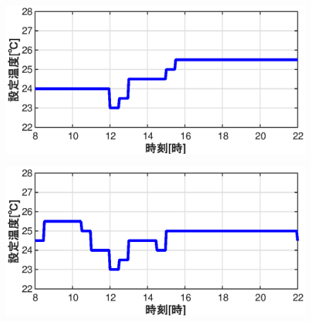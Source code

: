 \begin{figure}[htbp]
  \begin{center}
    \begin{minipage}{0.4\textwidth}
      \begin{center}
        \includegraphics[width=1.0\textwidth,keepaspectratio=true]{fig/math_result_schedule_settemp_a.eps}\\
      \end{center}
    \end{minipage}
    \begin{minipage}{0.4\textwidth}
      \begin{center}
        \includegraphics[width=1.0\textwidth,keepaspectratio=true]{fig/math_result_schedule_settemp_b.eps}\\
      \end{center}
    \end{minipage}
    \begin{minipage}{0.4\textwidth}
      \begin{center}

\end{center}
\end{minipage}
\end{center}
\end{figure}
